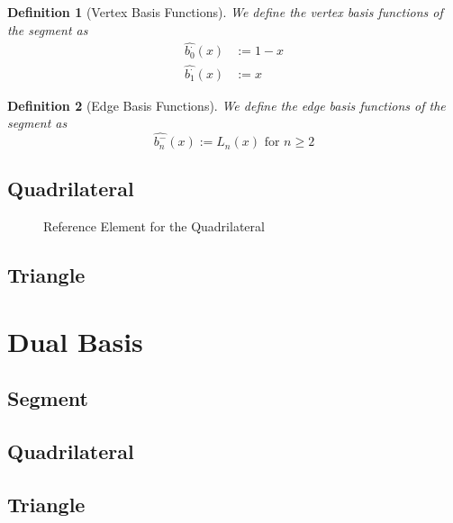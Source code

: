 \documentclass[10pt,a4paper]{article}
\newtheorem{defn}{Definition}
\begin{document}
    \begin{defn}[Vertex Basis Functions]
        We define the vertex basis functions of the segment as
        \begin{align*}
            \widehat{b_0^{\cdot}}(x) &:= 1 - x \\
            \widehat{b_1^{\cdot}}(x) &:= x
        \end{align*}
    \end{defn}

    \begin{defn}[Edge Basis Functions]
        We define the edge basis functions of the segment as
        \begin{equation*}
            \widehat{b_n^{-}}(x) := L_n(x) \mbox{ for } n \geq 2
        \end{equation*}
    \end{defn}


\subsection{Quadrilateral}

    \begin{figure}[ht!]
        \center
        \caption{Reference Element for the Quadrilateral}
        \label{fig:ref_quad}
    \end{figure}


\subsection{Triangle}


\section{Dual Basis}


\subsection{Segment}


\subsection{Quadrilateral}


\subsection{Triangle}
    
\end{document}
